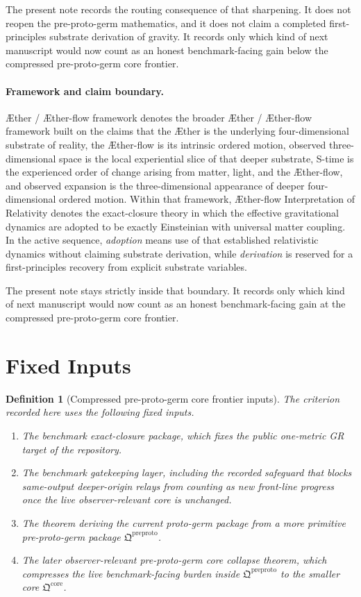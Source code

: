 \documentclass[11pt]{article}
\newcommand{\Aether}{\AE{}ther}
\newcommand{\Aflow}{\AE{}ther-flow}
\newcommand{\TheoryName}{\Aflow{} Interpretation of Relativity}
\newcommand{\TheoryProgram}{\Aether{} / \Aflow{} framework}
\newcommand{\PreProtoPackage}{\mathfrak Q^{\mathrm{preproto}}}
\newcommand{\PreProtoCore}{\mathfrak Q^{\mathrm{core}}}
\newtheorem{definition}{Definition}
\begin{document}
The present note records the routing consequence of that sharpening. It does not reopen the pre-proto-germ mathematics, and it does not claim a completed first-principles substrate derivation of gravity. It records only which kind of next manuscript would now count as an honest benchmark-facing gain below the compressed pre-proto-germ core frontier.

\paragraph{Framework and claim boundary.}
\TheoryProgram{} denotes the broader \Aether{} / \Aflow{} framework built on the claims that the \Aether{} is the underlying four-dimensional substrate of reality, the \Aflow{} is its intrinsic ordered motion, observed three-dimensional space is the local experiential slice of that deeper substrate, S-time is the experienced order of change arising from matter, light, and the \Aflow{}, and observed expansion is the three-dimensional appearance of deeper four-dimensional ordered motion. Within that framework, \TheoryName{} denotes the exact-closure theory in which the effective gravitational dynamics are adopted to be exactly Einsteinian with universal matter coupling. In the active sequence, \emph{adoption} means use of that established relativistic dynamics without claiming substrate derivation, while \emph{derivation} is reserved for a first-principles recovery from explicit substrate variables.

The present note stays strictly inside that boundary. It records only which kind of next manuscript would now count as an honest benchmark-facing gain at the compressed pre-proto-germ core frontier.

\section{Fixed Inputs}

\begin{definition}[Compressed pre-proto-germ core frontier inputs]
The criterion recorded here uses the following fixed inputs.
\begin{enumerate}
    \item The benchmark exact-closure package, which fixes the public one-metric GR target of the repository.
    \item The benchmark gatekeeping layer, including the recorded safeguard that blocks same-output deeper-origin relays from counting as new front-line progress once the live observer-relevant core is unchanged.
    \item The theorem deriving the current proto-germ package from a more primitive pre-proto-germ package \(\PreProtoPackage\).
    \item The later observer-relevant pre-proto-germ core collapse theorem, which compresses the live benchmark-facing burden inside \(\PreProtoPackage\) to the smaller core \(\PreProtoCore\).
\end{enumerate}
\end{definition}
\end{document}
